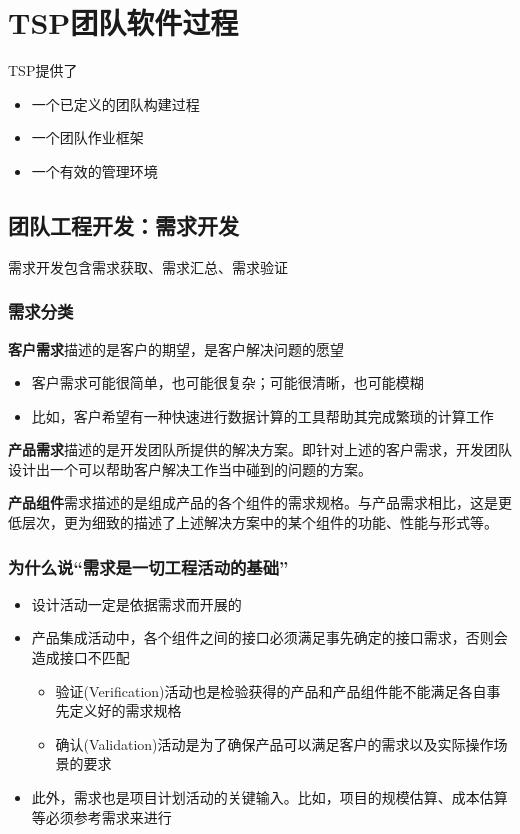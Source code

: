 \section{TSP团队软件过程}
TSP提供了
\vspace{-0.8em}
\begin{multicols}{3}
    \begin{itemize}
        \item 一个已定义的团队构建过程
        \item 一个团队作业框架
        \item 一个有效的管理环境
    \end{itemize}
\end{multicols}
\vspace{-1em}

\subsection{团队工程开发：需求开发}
需求开发包含需求获取、需求汇总、需求验证

\subsubsection{需求分类}
\textbf{客户需求}描述的是客户的期望，是客户解决问题的愿望
\begin{itemize}
    \item 客户需求可能很简单，也可能很复杂；可能很清晰，也可能模糊
    \item 比如，客户希望有一种快速进行数据计算的工具帮助其完成繁琐的计算工作
\end{itemize}

\textbf{产品需求}描述的是开发团队所提供的解决方案。即针对上述的客户需求，开发团队设计出一个可以帮助客户解决工作当中碰到的问题的方案。

\textbf{产品组件}需求描述的是组成产品的各个组件的需求规格。与产品需求相比，这是更低层次，更为细致的描述了上述解决方案中的某个组件的功能、性能与形式等。

\subsubsection{为什么说“需求是一切工程活动的基础”}
\begin{itemize}
    \item 设计活动一定是依据需求而开展的
    \item 产品集成活动中，各个组件之间的接口必须满足事先确定的接口需求，否则会造成接口不匹配
    \begin{itemize}
        \item 验证(Verification)活动也是检验获得的产品和产品组件能不能满足各自事先定义好的需求规格
        \item 确认(Validation)活动是为了确保产品可以满足客户的需求以及实际操作场景的要求
    \end{itemize}
    \item 此外，需求也是项目计划活动的关键输入。比如，项目的规模估算、成本估算等必须参考需求来进行
\end{itemize}

